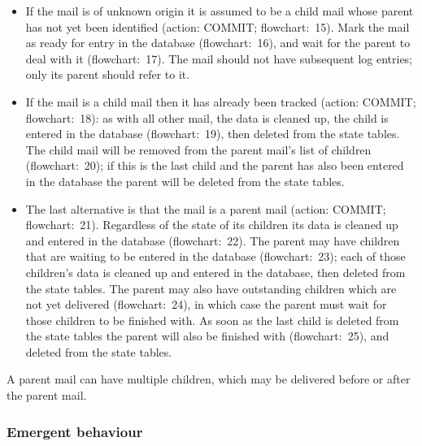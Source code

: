 \begin{itemize}

    \item If the mail is of unknown origin it is assumed to be a child mail
        whose parent has not yet been identified (action: COMMIT\@;
        flowchart:~15).  Mark the mail as ready for entry in the database
        (flowchart:~16), and wait for the parent to deal with it
        (flowchart:~17).  The mail should not have subsequent log entries;
        only its parent should refer to it.

    \item If the mail is a child mail then it has already been tracked
        (action: COMMIT\@; flowchart:~18): as with all other mail, the data
        is cleaned up, the child is entered in the database
        (flowchart:~19), then deleted from the state tables.  The child
        mail will be removed from the parent mail's list of children
        (flowchart:~20); if this is the last child and the parent has also
        been entered in the database the parent will be deleted from the
        state tables.

    \item The last alternative is that the mail is a parent mail (action:
        COMMIT\@; flowchart:~21).  Regardless of the state of its children
        its data is cleaned up and entered in the database (flowchart:~22).
        The parent may have children that are waiting to be entered in the
        database (flowchart:~23); each of those children's data is cleaned
        up and entered in the database, then deleted from the state tables.
        The parent may also have outstanding children which are not yet
        delivered (flowchart:~24), in which case the parent must wait for
        those children to be finished with.  As soon as the last child is
        deleted from the state tables the parent will also be finished with
        (flowchart:~25), and deleted from the state tables.

\end{itemize}

A parent mail can have multiple children, which may be delivered before or
after the parent mail.

\subsubsection{Emergent behaviour}

\label{Emergent behaviour}

